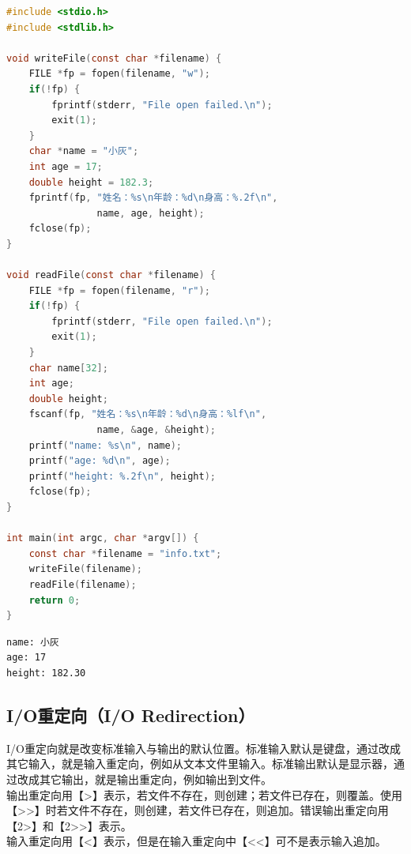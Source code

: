 \begin{lstlisting}[language=C]
#include <stdio.h>
#include <stdlib.h>

void writeFile(const char *filename) {
    FILE *fp = fopen(filename, "w");
    if(!fp) {
        fprintf(stderr, "File open failed.\n");
        exit(1);
    }
    char *name = "小灰";
    int age = 17;
    double height = 182.3;
    fprintf(fp, "姓名：%s\n年龄：%d\n身高：%.2f\n", 
                name, age, height);
    fclose(fp);
}

void readFile(const char *filename) {
    FILE *fp = fopen(filename, "r");
    if(!fp) {
        fprintf(stderr, "File open failed.\n");
        exit(1);
    }
    char name[32];
    int age;
    double height;
    fscanf(fp, "姓名：%s\n年龄：%d\n身高：%lf\n", 
                name, &age, &height);
    printf("name: %s\n", name);
    printf("age: %d\n", age);
    printf("height: %.2f\n", height);
    fclose(fp);
}

int main(int argc, char *argv[]) {
    const char *filename = "info.txt";
    writeFile(filename);
    readFile(filename);
    return 0;
}
\end{lstlisting}

\begin{tcolorbox}
    \begin{verbatim}
name: 小灰
age: 17
height: 182.30
	\end{verbatim}
\end{tcolorbox}

\vspace{0.5cm}

\subsection{I/O重定向（I/O Redirection）}

I/O重定向就是改变标准输入与输出的默认位置。标准输入默认是键盘，通过改成其它输入，就是输入重定向，例如从文本文件里输入。标准输出默认是显示器，通过改成其它输出，就是输出重定向，例如输出到文件。\\

输出重定向用【>】表示，若文件不存在，则创建；若文件已存在，则覆盖。使用【>>】时若文件不存在，则创建，若文件已存在，则追加。错误输出重定向用【2>】和【2>>】表示。\\

输入重定向用【<】表示，但是在输入重定向中【<<】可不是表示输入追加。\\


